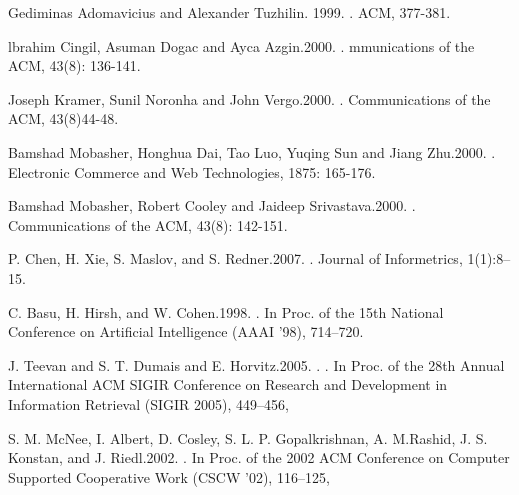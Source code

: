 \begin{thebibliography}{10}

Gediminas Adomavicius and Alexander Tuzhilin. 1999.
.
\newblock ACM, 377-381.

lbrahim Cingil, Asuman Dogac and Ayca Azgin.2000.
.
\newblock mmunications of the ACM, 43(8): 136-141.

Joseph Kramer, Sunil Noronha and John Vergo.2000.
.
\newblock Communications of the ACM, 43(8)44-48.

Bamshad Mobasher, Honghua Dai, Tao Luo, Yuqing Sun and Jiang Zhu.2000.
.
\newblock Electronic Commerce and Web Technologies, 1875: 165-176.

Bamshad Mobasher, Robert Cooley and Jaideep Srivastava.2000.
.
\newblock Communications of the ACM, 43(8): 142-151.

P. Chen, H. Xie, S. Maslov, and S. Redner.2007.
.
\newblock Journal of Informetrics, 1(1):8--15.

C. Basu, H. Hirsh, and W. Cohen.1998.
.
\newblock In Proc. of the 15th National Conference on Artificial Intelligence (AAAI ’98), 714–720.

J. Teevan and S. T. Dumais and E. Horvitz.2005.
.
\newblock . In Proc. of the 28th Annual International ACM SIGIR Conference on Research and Development in Information Retrieval (SIGIR 2005), 449–456,

S. M. McNee, I. Albert, D. Cosley, S. L. P. Gopalkrishnan, A. M.Rashid, J. S. Konstan, and J. Riedl.2002.
.
\newblock  In Proc. of the 2002 ACM Conference on Computer Supported Cooperative Work (CSCW ’02), 116–125,


\end{thebibliography}
